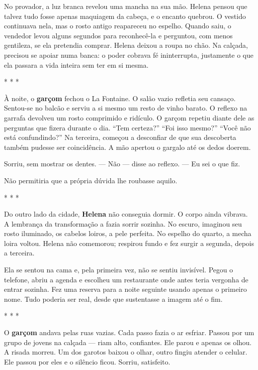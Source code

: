 No provador, a luz branca revelou uma mancha na sua mão. Helena pensou que talvez tudo fosse apenas maquiagem da cabeça, e o encanto quebrou. O vestido continuava nela, mas o rosto antigo reapareceu no espelho. Quando saiu, o vendedor levou alguns segundos para reconhecê-la e perguntou, com menos gentileza, se ela pretendia comprar. Helena deixou a roupa no chão. Na calçada, precisou se apoiar numa banca: o poder cobrava fé ininterrupta, justamente o que ela passara a vida inteira sem ter em si mesma.

\begin{center}
* * *
\end{center}

À noite, o \textbf{garçom} fechou o La Fontaine.  
O salão vazio refletia seu cansaço.  
Sentou-se no balcão e serviu a si mesmo um resto de vinho barato.  
O reflexo na garrafa devolveu um rosto comprimido e ridículo. O garçom repetiu diante dele as perguntas que fizera durante o dia. “Tem certeza?” “Foi isso mesmo?” “Você não está confundindo?” Na terceira, começou a desconfiar de que sua descoberta também pudesse ser coincidência. A mão apertou o gargalo até os dedos doerem.

Sorriu, sem mostrar os dentes.
— Não — disse ao reflexo. — Eu sei o que fiz.

Não permitiria que a própria dúvida lhe roubasse aquilo.

\begin{center}
* * *
\end{center}

Do outro lado da cidade, \textbf{Helena} não conseguia dormir.  
O corpo ainda vibrava.  
A lembrança da transformação a fazia sorrir sozinha.  
No escuro, imaginou seu rosto iluminado, os cabelos loiros, a pele perfeita.  
No espelho do quarto, a mecha loira voltou. Helena não comemorou; respirou fundo e fez surgir a segunda, depois a terceira.

Ela se sentou na cama e, pela primeira vez, não se sentiu invisível. Pegou o telefone, abriu a agenda e escolheu um restaurante onde antes teria vergonha de entrar sozinha. Fez uma reserva para a noite seguinte usando apenas o primeiro nome. Tudo poderia ser real, desde que sustentasse a imagem até o fim.

\begin{center}
* * *
\end{center}

O \textbf{garçom} andava pelas ruas vazias.  
Cada passo fazia o ar esfriar.  
Passou por um grupo de jovens na calçada — riam alto, confiantes.  
Ele parou e apenas os olhou.  
A risada morreu.  
Um dos garotos baixou o olhar, outro fingiu atender o celular.  
Ele passou por eles e o silêncio ficou.  
Sorriu, satisfeito.

